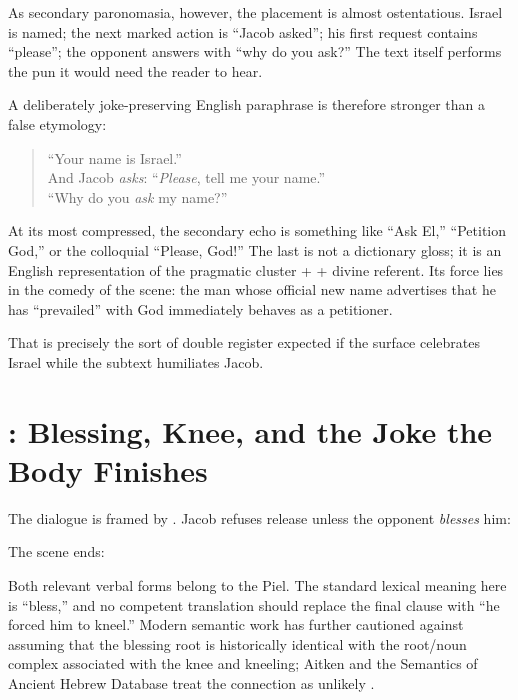 As secondary paronomasia, however, the placement is almost ostentatious. Israel is named; the next marked action is ``Jacob asked''; his first request contains ``please''; the opponent answers with ``why do you ask?'' The text itself performs the pun it would need the reader to hear.

A deliberately joke-preserving English paraphrase is therefore stronger than a false etymology:

\begin{quote}\small
``Your name is Israel.''\\
And Jacob \emph{asks}: ``\emph{Please}, tell me your name.''\\
``Why do you \emph{ask} my name?''
\end{quote}

At its most compressed, the secondary echo is something like ``Ask El,'' ``Petition God,'' or the colloquial ``Please, God!'' The last is not a dictionary gloss; it is an English representation of the pragmatic cluster  +  + divine referent. Its force lies in the comedy of the scene: the man whose official new name advertises that he has ``prevailed'' with God immediately behaves as a petitioner.

That is precisely the sort of double register expected if the surface celebrates Israel while the subtext humiliates Jacob.

\section{: Blessing, Knee, and the Joke the Body Finishes}

The dialogue is framed by . Jacob refuses release unless the opponent \emph{blesses} him:


The scene ends:


Both relevant verbal forms belong to the Piel. The standard lexical meaning here is ``bless,'' and no competent translation should replace the final clause with ``he forced him to kneel.'' Modern semantic work has further cautioned against assuming that the blessing root is historically identical with the root/noun complex associated with the knee and kneeling; Aitken and the Semantics of Ancient Hebrew Database treat the connection as unlikely \parencite{Aitken2007,SAHDBRK}.

